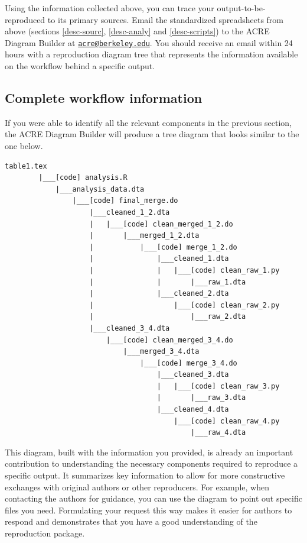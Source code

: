 \documentclass[]{book}
\begin{document}
Using the information collected above, you can trace your output-to-be-reproduced to its primary sources. Email the standardized spreadsheets from above (sections \ref{desc-sourc}, \ref{desc-analy} and \ref{desc-scripts}) to the ACRE Diagram Builder at \href{mailto:acre@berkeley.edu}{\nolinkurl{acre@berkeley.edu}}. You should receive an email within 24 hours with a reproduction diagram tree that represents the information available on the workflow behind a specific output.

\hypertarget{complete-workflow-information}{%
\subsection{Complete workflow information}\label{complete-workflow-information}}

If you were able to identify all the relevant components in the previous section, the ACRE Diagram Builder will produce a tree diagram that looks similar to the one below.

\begin{verbatim}
table1.tex
        |___[code] analysis.R
            |___analysis_data.dta
                |___[code] final_merge.do
                    |___cleaned_1_2.dta
                    |   |___[code] clean_merged_1_2.do
                    |       |___merged_1_2.dta
                    |           |___[code] merge_1_2.do
                    |               |___cleaned_1.dta
                    |               |   |___[code] clean_raw_1.py
                    |               |       |___raw_1.dta
                    |               |___cleaned_2.dta
                    |                   |___[code] clean_raw_2.py
                    |                       |___raw_2.dta
                    |___cleaned_3_4.dta
                        |___[code] clean_merged_3_4.do
                            |___merged_3_4.dta
                                |___[code] merge_3_4.do
                                    |___cleaned_3.dta
                                    |   |___[code] clean_raw_3.py
                                    |       |___raw_3.dta
                                    |___cleaned_4.dta
                                        |___[code] clean_raw_4.py
                                            |___raw_4.dta
\end{verbatim}

This diagram, built with the information you provided, is already an important contribution to understanding the necessary components required to reproduce a specific output. It summarizes key information to allow for more constructive exchanges with original authors or other reproducers. For example, when contacting the authors for guidance, you can use the diagram to point out specific files you need. Formulating your request this way makes it easier for authors to respond and demonstrates that you have a good understanding of the reproduction package.
\end{document}
